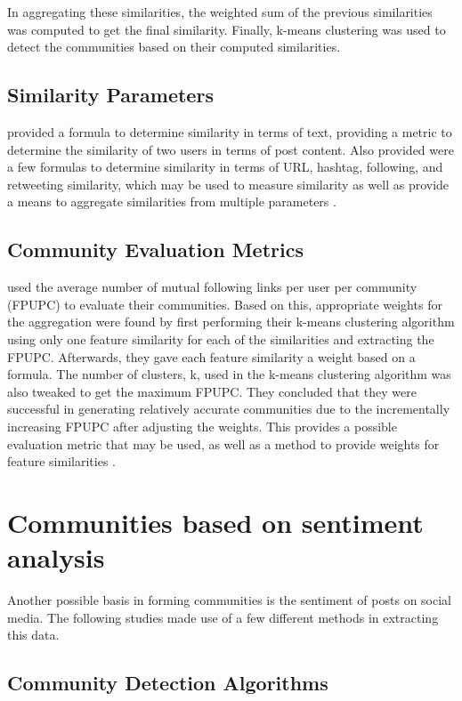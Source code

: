 In aggregating these similarities, the weighted sum of the previous similarities was computed to get the final similarity. Finally, k-means clustering was used to detect the communities based on their computed similarities. 


\subsection{Similarity Parameters}


 provided a formula to determine similarity in terms of text, providing a metric to determine the similarity of two users in terms of post content. Also provided were a few formulas to determine similarity in terms of URL, hashtag, following, and retweeting similarity, which may be used to measure similarity as well as provide a means to aggregate similarities from multiple parameters \cite{Zhang:2012}. 


\subsection{Community Evaluation Metrics}


 used the average number of mutual following links per user per community (FPUPC) to evaluate their communities. Based on this, appropriate weights for the aggregation were found by first performing their k-means clustering algorithm using only one feature similarity for each of the similarities and extracting the FPUPC. Afterwards, they gave each feature similarity a weight based on a formula. The number of clusters, k, used in the k-means clustering algorithm was also tweaked to get the maximum FPUPC. They concluded that they were successful in generating relatively accurate communities due to the incrementally increasing FPUPC after adjusting the weights. This provides a possible evaluation metric that may be used, as well as a method to provide weights for feature similarities \cite{Zhang:2012}.


\section{Communities based on sentiment analysis}


Another possible basis in forming communities is the sentiment of posts on social media. The following studies made use of a few different methods in extracting this data.


\subsection{Community Detection Algorithms}



